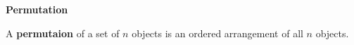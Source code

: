 {\bf Permutation}
\vskip 6pt

A {\bf permutaion} of a set of $n$ objects is an ordered arrangement of all $n$ objects.

\vfill\eject

